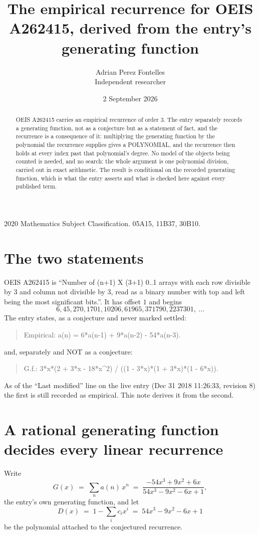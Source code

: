 \documentclass[11pt,a4paper]{article}
\title{The empirical recurrence for OEIS A262415, derived from the entry's generating function}
\author{Adrian Perez Fontelles\\ \small Independent researcher}
\date{2 September 2026}
\theoremstyle{plain}
\theoremstyle{definition}
\begin{document}
\maketitle

\begin{abstract}
OEIS A262415 carries an empirical recurrence of order $3$. The entry separately records a
generating function, not as a conjecture but as a statement of fact, and the recurrence is a
consequence of it: multiplying the generating function by the polynomial the recurrence
supplies gives a POLYNOMIAL, and the recurrence then holds at every index past that
polynomial's degree. No model of the objects being counted is needed, and no search: the
whole argument is one polynomial division, carried out in exact arithmetic. The result is
conditional on the recorded generating function, which is what the entry asserts and what is
checked here against every published term.
\end{abstract}

\noindent\small 2020 Mathematics Subject Classification. 05A15, 11B37, 30B10.\normalsize

\section{The two statements}

OEIS A262415 is ``Number of (n+1) X (3+1) 0..1 arrays with each row divisible by 3 and column not divisible by 3, read as a binary number with top and left being the most significant bits.''. It has offset $1$ and begins
\[
6, 45, 270, 1701, 10206, 61965, 371790, 2237301,\ \dots
\]
The entry states, as a conjecture and never marked settled:
\begin{quote}
Empirical: a(n) = 6*a(n-1) + 9*a(n-2) - 54*a(n-3).
\end{quote}
and, separately and NOT as a conjecture:
\begin{quote}
G.f.: 3*x*(2 + 3*x - 18*x\^{}2) /  ((1 - 3*x)*(1 + 3*x)*(1 - 6*x)).
\end{quote}
As of the ``Last modified'' line on the live entry (Dec 31 2018 11:26:33, revision 8) the first is still
recorded as empirical. This note derives it from the second.

\section{A rational generating function decides every linear recurrence}

Write
\[
G(x)\;=\;\sum_{n}a(n)\,x^{n}\;=\;\frac{- 54 x^{3} + 9 x^{2} + 6 x}{54 x^{3} - 9 x^{2} - 6 x + 1},
\]
the entry's own generating function, and let
\[
D(x)\;=\;1-\sum_i c_i x^{i}\;=\;54 x^{3} - 9 x^{2} - 6 x + 1
\]
be the polynomial attached to the conjectured recurrence.
\end{document}
